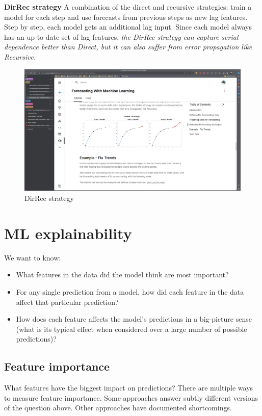 \documentclass[12pt]{report}
\begin{document}
\textbf{DirRec strategy} A combination of the direct and recursive strategies: train a model for each step and use forecasts from previous steps as new lag features. Step by step, each model gets an additional lag input. Since each model always has an up-to-date set of lag features, \textit{the DirRec strategy can capture serial dependence better than Direct, but it can also suffer from error propagation like Recursive.}

\begin{figure}[htbp]
  \begin{center}
    \includegraphics[trim =24cm 17.0cm 22cm 20cm, clip, scale=0.3]{pics/forecast4.png}
    \caption{DirRec strategy}
    \label{fig:DirRec}
  \end{center}
\end{figure}


\section{ML explainability}

We want to know:

\begin{itemize}
  \item What features in the data did the model think are most important?
  \item For any single prediction from a model, how did each feature in the data affect that particular prediction?
  \item How does each feature affects the model's predictions in a big-picture sense (what is its typical effect when considered over a large number of possible predictions)?
\end{itemize}

\subsection{Feature importance}
What features have the biggest impact on predictions? There are multiple ways to measure feature importance. Some approaches answer subtly different versions of the question above. Other approaches have documented shortcomings.
\end{document}
